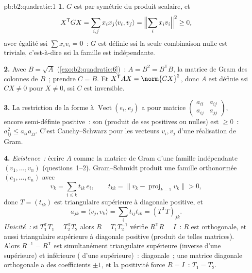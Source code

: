 \begin{solution}{pb:b2:quadratic:1}
\textbf{1.} $G$ est  par symétrie du produit scalaire,
et
\[
X^{\mathsf T}GX = \sum_{i,j}x_ix_j\langle v_i, v_j\rangle
= \Bigl\|\sum_i x_iv_i\Bigr\|^2 \geq 0 ,
\]
avec égalité ssi $\sum x_iv_i = 0$~: $G$ est définie ssi la
seule combinaison nulle est triviale, c'est-à-dire ssi la famille
est indépendante.

\textbf{2.} Avec $B = \sqrt A$ (\cref{exo:b2:quadratic:6})~: $A
= B^2 = B^{\mathsf T}B$, la matrice de Gram des colonnes de $B$~;
prendre $C = B$. Et $X^{\mathsf T}AX = \norm{CX}^2$, donc $A$ est
définie ssi $CX \neq 0$ pour $X \neq 0$, ssi $C$ est inversible.

\textbf{3.} La restriction de la forme à
$\operatorname{Vect}(e_i, e_j)$ a pour matrice
$\begin{pmatrix} a_{ii} & a_{ij}\\ a_{ij} & a_{jj}
\end{pmatrix}$, encore semi-définie positive~: son 
(produit de ses  positives ou nulles) est $\geq 0$~:
$a_{ij}^2 \leq a_{ii}a_{jj}$. C'est Cauchy--Schwarz pour les
vecteurs $v_i, v_j$ d'une réalisation de Gram.

\textbf{4.} \emph{Existence~:} écrire $A$ comme la matrice de Gram
d'une famille indépendante $(v_1, \dots, v_n)$ (questions~1--2).
Gram--Schmidt produit une famille orthonormée $(e_1, \dots, e_n)$
avec
\[
v_k = \sum_{i \leq k} t_{ik}\,e_i,
\qquad t_{kk} = \bigl\| v_k - \operatorname{proj}_{k-1}v_k
\bigr\| > 0 ,
\]
donc $T = (t_{ik})$ est triangulaire supérieure à diagonale
positive, et
\[
a_{jk} = \langle v_j, v_k\rangle
= \sum_i t_{ij}t_{ik} = (T^{\mathsf T}T)_{jk} .
\]
\emph{Unicité~:} si $T_1^{\mathsf T}T_1 = T_2^{\mathsf T}T_2$
alors $R = T_1T_2^{-1}$ vérifie $R^{\mathsf T}R = I$~: $R$ est
orthogonale, et aussi triangulaire supérieure à diagonale positive
(produit de telles matrices). Alors $R^{-1} = R^{\mathsf T}$ est
simultanément triangulaire supérieure (inverse d'une supérieure) et
inférieure ( d'une supérieure)~: diagonale~; une matrice
diagonale orthogonale a des coefficients $\pm1$, et la positivité
force $R = I$~: $T_1 = T_2$.


\end{solution}
